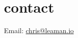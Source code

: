\section{contact}
\begin{adjustwidth}{2cm}{}
  \vspace{-2\parskip}
  \begin{multicols}{3}
    Email: \href{mailto:chris@leaman.io}{chris@leaman.io}\\
    \\
    \\
    \\
    \\
    \\
  \end{multicols}
  \vspace{-5\parskip}
\end{adjustwidth}
